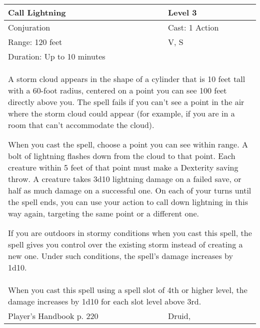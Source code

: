 \documentclass[11pt]{report}
\begin{document}
\begin{table}[H]
	\begin{tabular}{||p{6cm}|p{6cm}||}
		\hline\hline
		\bf{Call Lightning} & Level 3\\ \hline
		Conjuration & Cast: 1 Action\\ \hline
		Range: 120 feet & V, S\\ \hline
		Duration: Up to 10 minutes & \\ \hline
		\multicolumn{2}{||p{12cm}||}{A storm cloud appears in the shape of a cylinder that is 10 feet tall with a 60-foot radius, centered on a point you can see 100 feet directly above you. The spell fails if you can’t see a point in the air where the storm cloud could appear (for example, if you are in a room that can’t accommodate the cloud). 

When you cast the spell, choose a point you can see within range. A bolt of lightning flashes down from the cloud to that point. Each creature within 5 feet of that point must make a Dexterity saving throw. A creature takes 3d10 lightning damage on a failed save, or half as much damage on a successful one. On each of your turns until the spell ends, you can use your action to call down lightning in this way again, targeting the same point or a different one. 

If you are outdoors in stormy conditions when you cast this spell, the spell gives you control over the existing storm instead of creating a new one. Under such conditions, the spell’s damage increases by 1d10.}\\ \hline
		\multicolumn{2}{||p{12cm}||}{When you cast this spell using a spell slot of 4th or higher level, the damage increases by 1d10 for each slot level above 3rd.}\\ \hline
Player's Handbook p. 220 & Druid, \\ \hline\hline
	\end{tabular}
\end{table}
\end{document}
